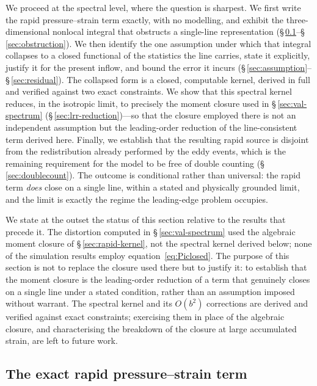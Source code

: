 \documentclass[lineno]{JFM-FLM_Au}
\newcounter{assumption}
\begin{document}
We proceed at the spectral level, where the question is sharpest. We first
write the rapid pressure--strain term exactly, with no modelling, and exhibit
the three-dimensional nonlocal integral that obstructs a single-line
representation (\S\,\ref{sec:exact-pi}--\S\,\ref{sec:obstruction}). We then
identify the one assumption under which that integral collapses to a closed
functional of the statistics the line carries, state it explicitly, justify it
for the present inflow, and bound the error it incurs
(\S\,\ref{sec:assumption}--\S\,\ref{sec:residual}). The collapsed form is a
closed, computable kernel, derived in full and verified against two exact
constraints. We show that this spectral kernel reduces, in the isotropic limit,
to precisely the moment closure used in \S\,\ref{sec:val-spectrum}
(\S\,\ref{sec:lrr-reduction})---so that the closure employed there is not an
independent assumption but the leading-order reduction of the line-consistent
term derived here. Finally, we establish that the resulting rapid source is
disjoint from the redistribution already performed by the eddy events, which is
the remaining requirement for the model to be free of double counting
(\S\,\ref{sec:doublecount}). The outcome is conditional rather than universal:
the rapid term \emph{does} close on a single line, within a stated and
physically grounded limit, and the limit is exactly the regime the
leading-edge problem occupies.

We state at the outset the status of this section relative to the results that
precede it. The distortion computed in \S\,\ref{sec:val-spectrum} used the
algebraic moment closure of \S\,\ref{sec:rapid-kernel}, not the spectral kernel
derived below; none of the simulation results employ equation~\eqref{eq:Piclosed}.
The purpose of this section is not to replace the closure used there but to
justify it: to establish that the moment closure is the leading-order reduction
of a term that genuinely closes on a single line under a stated condition, rather
than an assumption imposed without warrant. The spectral kernel and its $O(b^2)$
corrections are derived and verified against exact constraints; exercising them
in place of the algebraic closure, and characterising the breakdown of the
closure at large accumulated strain, are left to future work.

\subsection{The exact rapid pressure--strain term}\label{sec:exact-pi}
\end{document}
